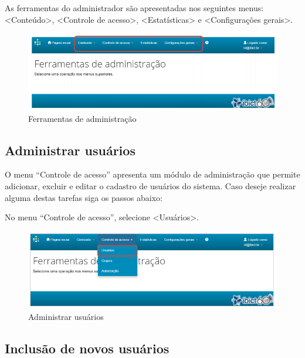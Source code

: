 \documentclass[12pt,hidelinks]{article}
\begin{document}
    As ferramentas do administrador são apresentadas nos seguintes menus: <Conteúdo>, <Controle de acesso>, <Estatísticas> e <Configurações gerais>.
    
    \begin{figure}[!htp]
                \centering
                \includegraphics[scale=0.8]{figura/Figura51.png}
                \caption{Ferramentas de administração}
            \label{Rotulo}
        \end{figure}
        
    \subsection{Administrar usuários}

    O menu “Controle de acesso” apresenta um módulo de administração que permite adicionar, excluir e editar o cadastro de usuários do sistema. Caso deseje realizar alguma destas tarefas siga os passos abaixo:
    
    \singlespacing
    
    No menu “Controle de acesso”, selecione <Usuários>.

    \begin{figure}[!htp]
                \centering
                \includegraphics[scale=0.8]{figura/Figura52.png}
                \caption{Administrar usuários}
            \label{Rotulo}
        \end{figure}

\newpage 

    \subsection{Inclusão de novos usuários}
    
\end{document}
